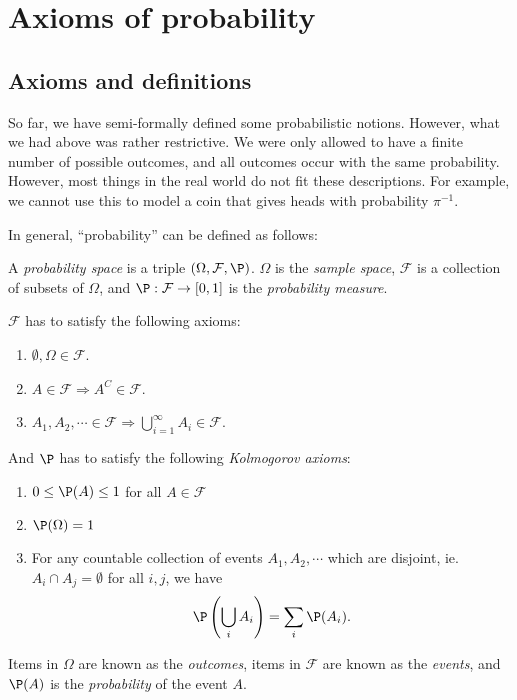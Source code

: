 \documentclass[a4paper]{article}
\begin{document}
\section{Axioms of probability}
\label{sec:axioms}
\subsection{Axioms and definitions}
So far, we have semi-formally defined some probabilistic notions. However, what we had above was rather restrictive. We were only allowed to have a finite number of possible outcomes, and all outcomes occur with the same probability. However, most things in the real world do not fit these descriptions. For example, we cannot use this to model a coin that gives heads with probability $\pi^{-1}$.

In general, ``probability'' can be defined as follows:
\begin{defi}
  A \emph{probability space} is a triple $(\Omega, \mathcal{F}, \P)$. $\Omega$ is the \emph{sample space}, $\mathcal{F}$ is a collection of subsets of $\Omega$, and $\P: \mathcal{F}\to [0, 1]$ is the \emph{probability measure}.

  $\mathcal{F}$ has to satisfy the following axioms:
  \begin{enumerate}
    \item $\emptyset, \Omega\in \mathcal{F}$.
    \item $A\in \mathcal{F} \Rightarrow  A^C\in \mathcal{F}$.
    \item $A_1, A_2, \cdots \in \mathcal{F} \Rightarrow \bigcup_{i = 1}^\infty A_i \in \mathcal{F}$.
  \end{enumerate}
  And $\P$ has to satisfy the following \emph{Kolmogorov axioms}:
  \begin{enumerate}
    \item $0 \leq \P(A) \leq 1 $ for all $A\in \mathcal{F}$
    \item $\P(\Omega) = 1$
    \item For any countable collection of events $A_1, A_2, \cdots$ which are disjoint, ie. $A_i\cap A_j = \emptyset$ for all $i, j$, we have
      \[
        \P\left(\bigcup_i A_i\right) = \sum_i \P(A_i).
      \]
  \end{enumerate}
  Items in $\Omega$ are known as the \emph{outcomes}, items in $\mathcal{F}$ are known as the \emph{events}, and $\P(A)$ is the \emph{probability} of the event $A$.
\end{defi}
\end{document}
